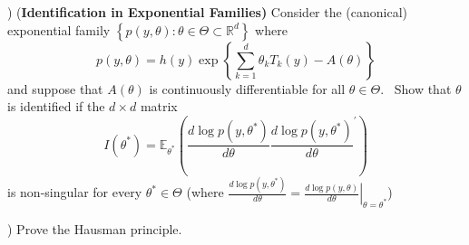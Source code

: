 \documentclass[12pt,english]{article}
\begin{document}
\vspace{1em}
) (\textbf{Identification in Exponential Families) }Consider the
(canonical) exponential family $\left\{ p\left( y,\theta \right) :\theta \in
\Theta\subset\mathbb{R}^{d} \right\} $ where%
\begin{equation*}
p\left( y,\theta \right) =h\left( y\right) \exp \left\{ \sum_{k=1}^{d}\theta
_{k}T_{k}\left( y\right) -A\left( \theta \right) \right\}
\end{equation*}%
and suppose that $A\left( \theta \right) $ is continuously
differentiable for all 
$\theta \in \Theta $. \ Show that $\theta $ is identified if the $d\times d$
matrix%
\begin{equation*}
I\left( \theta ^{\ast }\right) =\mathbb{E}_{\theta^{*}}\left( \frac{d\log p\left(
	y,\theta ^{\ast }\right) }{d\theta }\frac{d\log p\left( y,\theta ^{\ast
	}\right) }{d\theta }^{\prime }\right)
\end{equation*}
is non-singular for every $\theta ^{\ast }\in \Theta $ (where $\frac{d\log
	p\left( y,\theta ^{\ast }\right) }{d\theta }=\left. \frac{d\log p\left(
	y,\theta \right) }{d\theta }\right\vert _{\theta =\theta ^{\ast }}$)

\vspace{1em}
) Prove the Hausman principle.
\end{document}
